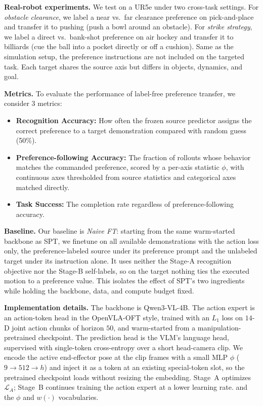 \documentclass{article}
\begin{document}
\textbf{Real-robot experiments.}
We test on a UR5e under two cross-task settings.
For \emph{obstacle clearance}, we label a near vs.\ far clearance preference on pick-and-place and transfer it to pushing (push a bowl around an obstacle).
For \emph{strike strategy}, we label a direct vs.\ bank-shot preference on air hockey and transfer it to billiards (cue the ball into a pocket directly or off a cushion). Same as the simulation setup, the preference instructions are not included on the targeted task.
Each target shares the source axis but differs in objects, dynamics, and goal.

\textbf{Metrics.}
To evaluate the performance of label-free preference transfer, we consider 3 metrics:
\begin{itemize}
    \item \textbf{Recognition Accuracy:} How often the frozen source predictor assigns the correct preference to a target demonstration compared with random guess (50\%).
    \item \textbf{Preference-following Accuracy:} The fraction of rollouts whose behavior matches the commanded preference, scored by a per-axis statistic $\phi$, with continuous axes thresholded from source statistics and categorical axes matched directly.
    \item \textbf{Task Success:} The completion rate regardless of preference-following accuracy.
\end{itemize}

\textbf{Baseline.}
Our baseline is \emph{Naive FT}: starting from the same warm-started backbone as
SPT, we finetune on all available demonstrations with the action loss only, the
preference-labeled source under its preference prompt and the unlabeled target
under its instruction alone. It uses neither the Stage-A recognition objective
nor the Stage-B self-labels, so on the target nothing ties the executed motion to
a preference value. This isolates the effect of SPT's two ingredients while
holding the backbone, data, and compute budget fixed.








\textbf{Implementation details.}
The backbone is Qwen3-VL-4B.
The action expert is an action-token head in the OpenVLA-OFT style, trained with an $L_1$ loss on $14$-D joint action chunks of horizon $50$, and warm-started from a manipulation-pretrained checkpoint.
The prediction head is the VLM's language head, supervised with single-token cross-entropy over a short head-camera clip.
We encode the active end-effector pose at the clip frames with a small MLP $\phi$ ($9\!\to\!512\!\to\!h$) and inject it as a token at an existing special-token slot, so the pretrained checkpoint loads without resizing the embedding.
Stage~A optimizes $\mathcal{L}_A$; Stage~B continues training the action expert at a lower learning rate.  and the $\phi$ and $w(\cdot)$ vocabularies.
\end{document}
